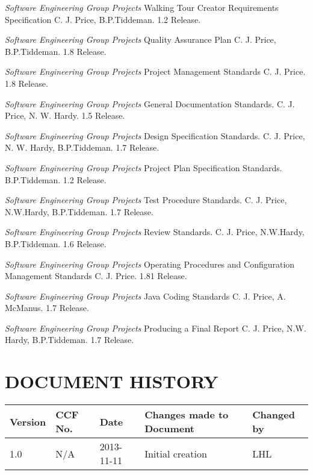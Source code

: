 \documentclass{project}
\begin{document}
\clearpage
{}
\begin{thebibliography}{5}

 \emph{Software Engineering Group Projects}
Walking Tour Creator Requirements Specification
C. J. Price, B.P.Tiddeman. 1.2 Release.

 \emph{Software Engineering Group Projects}
Quality Assurance Plan
C. J. Price, B.P.Tiddeman. 1.8 Release.

 \emph{Software Engineering Group Projects}
Project Management Standards
C. J. Price. 1.8 Release.

 \emph{Software Engineering Group Projects}
General Documentation Standards.
C. J. Price, N. W. Hardy. 1.5 Release.

 \emph{Software Engineering Group Projects}
Design Specification Standards.
C. J. Price, N. W. Hardy, B.P.Tiddeman. 1.7 Release.

 \emph{Software Engineering Group Projects}
Project Plan Specification Standards.
B.P.Tiddeman. 1.2 Release.

 \emph{Software Engineering Group Projects}
Test Procedure Standards.
C. J. Price, N.W.Hardy, B.P.Tiddeman. 1.7 Release.

 \emph{Software Engineering Group Projects}
Review Standards.
C. J. Price, N.W.Hardy, B.P.Tiddeman. 1.6 Release.

 \emph{Software Engineering Group Projects}
Operating Procedures and Configuration Management Standards
C. J. Price. 1.81 Release.

 \emph{Software Engineering Group Projects}
Java Coding Standards
C. J. Price, A. McManus. 1.7 Release.

 \emph{Software Engineering Group Projects}
Producing a Final Report
C. J. Price, N.W. Hardy, B.P.Tiddeman. 1.7 Release.

\end{thebibliography}

\section*{DOCUMENT HISTORY}
\begin{flushleft}
\begin{tabular}{ | p{1.5cm} | p{1cm} | p{2cm} | p{6cm}| p{1.5cm}| }
\hline
Version & CCF No. & Date & Changes made to Document & Changed by \\
\hline

1.0 & N/A & 2013-11-11 & Initial creation & LHL \\
\hline

\end{tabular}
\end{flushleft}
\label{thelastpage}
\end{document}
